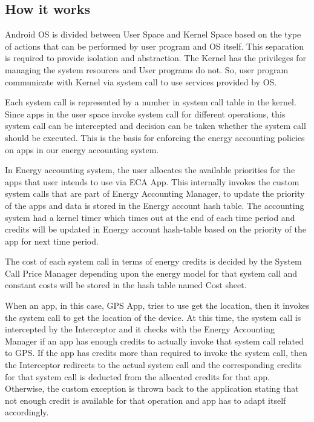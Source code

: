 \subsection{How it works}

Android OS is divided between User Space and Kernel Space based on the type of actions that can be performed by user program and OS itself. This separation is required to provide isolation and abstraction. The Kernel has the privileges for managing the system resources and User programs do not. So, user program communicate with Kernel via system call to use services provided by OS. 

Each system call is represented by a number in system call table in the kernel. Since apps in the user space invoke system call for different operations, this system call can be intercepted and decision can be taken whether the system call should be executed. This is the basis for enforcing the energy accounting policies on apps in our energy accounting system. 

In Energy accounting system, the user allocates the available priorities for the apps that user intends to use via ECA App. This internally invokes the custom system calls that are part of Energy Accounting Manager, to update the priority of the apps and data is stored in the Energy account hash table. The accounting system had a kernel timer which times out at the end of each time period and credits will be updated in Energy account hash-table based on the priority of the app for next time period. 

The cost of each system call in terms of energy credits is decided by the System Call Price Manager depending upon the energy model for that system call and constant costs will be stored in the hash table named Cost sheet. 

When an app, in this case, GPS App, tries to use get the location, then it invokes the system call to get the location of the device. At this time, the system call is intercepted by the Interceptor and it checks with the Energy Accounting Manager if an app has enough credits to actually invoke that system call related to GPS. If the app has credits more than required to invoke the system call, then the Interceptor redirects to the actual system call and the corresponding credits for that system call is deducted from the allocated credits for that app. Otherwise, the custom exception is thrown back to the application stating that not enough credit is available for that operation and app has to adapt itself accordingly. 

